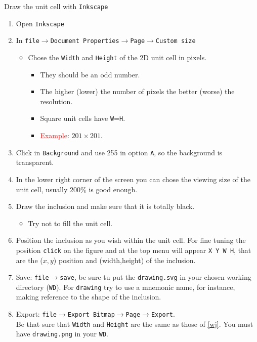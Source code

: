 \documentclass[preprint,12pt]{revtex4}
\def\colore{red}
\begin{document}
 Draw the unit cell with \verb=Inkscape=
\begin{enumerate}
\item Open \verb=Inkscape=
\item In \verb=file=$\to$\verb=Document Properties=$\to$\verb=Page=$\to$\verb=Custom size=\\
\label{wj}
\begin{itemize}
\item Chose the \verb=Width= and \verb=Height= of the 2D unit cell in 
pixels. 
\begin{itemize}
\item They should be an odd number. 
\item The higher (lower) the number of pixels the better (worse) the resolution.
\item  Square unit cells have \verb=W==\verb=H=.
\item \textcolor{\colore}{Example}: $201\times 201$. 
\end{itemize}
\end{itemize}
\item Click in \verb=Background= and use 255 in option \verb=A=, so
  the background is transparent.
\item In the lower right corner of the screen you can chose the
  viewing size of the unit cell, usually 200\% is good enough.
\item Draw the inclusion and make sure that it is totally black.
\begin{itemize}
\item Try not to fill the unit cell.
\end{itemize}
\item Position the inclusion as you wish within the unit cell. For
  fine tuning the position \verb=click= on the figure and at the top
  menu will appear \verb=X Y W H=, that are the ($x,y$) position and
  (width,height) of the inclusion.
\item Save: \verb=file=$\to$\verb=save=, be sure tu put the \verb=drawing.svg= in
  your chosen working directory (\verb=WD=). 
For \verb=drawing= 
try to use a mnemonic
 name, for instance, making reference to the shape of the inclusion.  

\item Export: \verb=file=$\to$\verb=Export Bitmap=$\to$\verb=Page=$\to$\verb=Export=. \\
Be that sure that \verb=Width= and \verb=Height= are the same as those
of \ref{wj}. You must have \verb=drawing.png= in your \verb=WD=.
\end{enumerate}
\end{document}
